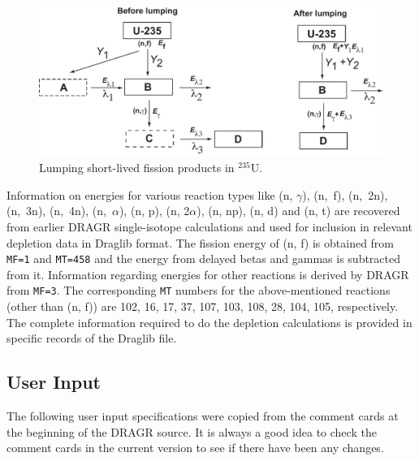 \begin{itemize}
%
\begin{figure}[h!]
\centering
\includegraphics[scale=0.5]{figs/lumped.pdf}
\parbox{11cm}{\caption{Lumping short-lived fission products in $^{235}$U.}
\label{fig:lumped}}   
\end{figure}
%

Information on energies for various reaction types like (n, $\gamma$),
\mbox{(n, f)}, \mbox{(n, 2n)}, \mbox{(n, 3n)}, \mbox{(n, 4n)},
\mbox{(n, $\alpha$)}, (n, p), (n, 2$\alpha$), (n, np), (n, d) and (n, t)
are recovered from earlier DRAGR single-isotope calculations and used for
inclusion in relevant depletion data in Draglib format. The fission energy
of (n, f) is obtained from {\tt MF=1} and {\tt MT=458} and the energy from
delayed betas and gammas is subtracted from it. Information regarding
energies for other reactions is derived by DRAGR from {\tt MF=3}. The
corresponding {\tt MT} numbers for the above-mentioned reactions (other
than (n, f)) are 102, 16, 17, 37, 107, 103, 108, 28, 104, 105, respectively.
The complete information required to do the depletion calculations is
provided in specific records of the Draglib file.

\end{itemize}

\subsection{User Input}
\label{ssDRAGR_inp}

The following user input specifications were copied from the comment
cards at the beginning of the DRAGR source.  It is always a good idea
to check the comment cards in the current version to see if there
have been any changes.

